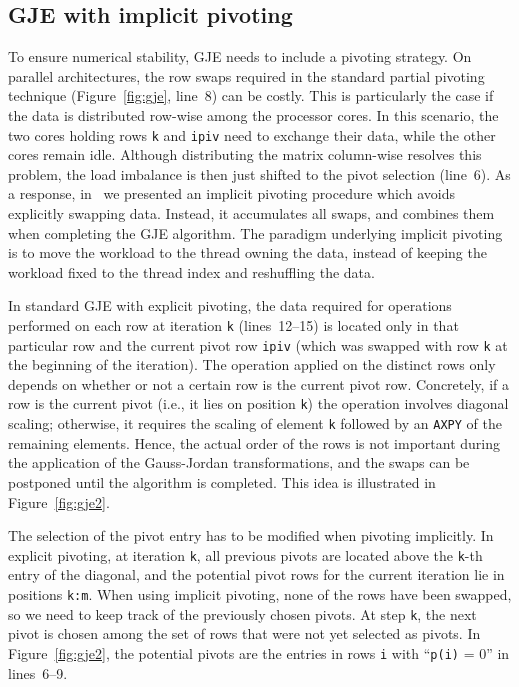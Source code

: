 \subsection{GJE with implicit pivoting}\label{sec:implicit-pivoting}
To ensure numerical stability, GJE needs to {include} a pivoting strategy.
On parallel architectures, the row swaps required
in the standard partial pivoting technique (Figure~\ref{fig:gje}, line~8)
can be costly.
This is particularly the case if the data is distributed row-wise
among the processor cores.
In this {scenario}, the two cores holding rows \texttt{k} and \texttt{ipiv}
need to exchange their data, while the other cores remain idle.
Although distributing the matrix column-wise resolves this problem,
the load imbalance is then just shifted to the pivot selection (line~6).
As a response, in~\cite{Anzt:2017:BGE:3026937.3026940}
we {presented} an implicit pivoting procedure
which avoids explicitly swapping data.
Instead, it accumulates all swaps, and combines them
when completing the GJE algorithm.
The paradigm underlying implicit pivoting is to move the {workload to the thread owning the data}, instead of 
keeping the workload fixed to the thread index and reshuffling the data.

In {standard GJE with} explicit pivoting, the data required for operations 
performed on each row at iteration \texttt{k} (lines~12--15)
is located only in that particular row
and the current pivot row \texttt{ipiv}
(which was swapped with row \texttt{k} at the beginning of the iteration).
The operation applied on the distinct rows only depends
on whether or not a certain row is the current pivot row.
{Concretely}, if a row is the current pivot (i.e., it lies on position \texttt{k})
the operation involves diagonal scaling;
otherwise, it requires the scaling of element \texttt{k} followed by an \texttt{AXPY}
of the remaining elements.
Hence, the actual order of the rows
is not important during the application of the Gauss-Jordan transformations,
and the swaps can be postponed until the algorithm is completed.
This idea is illustrated in Figure~\ref{fig:gje2}.


The selection of the pivot entry has to be modified when pivoting implicitly.
In explicit pivoting, at iteration \texttt{k}, all previous pivots are located above the \texttt{k}-th entry of the diagonal,
and the potential pivot rows for the current iteration lie in positions \texttt{k:m}.
When using implicit pivoting, {none of the rows} have been swapped, so we need to keep 
track of the previously chosen pivots.
At step \texttt{k}, the next pivot is chosen among the set of rows
that were not yet selected as pivots.
In Figure~\ref{fig:gje2}, the potential pivots are the entries in rows {\tt i} with ``\texttt{p(i)} = 0''  in lines~6--9.


